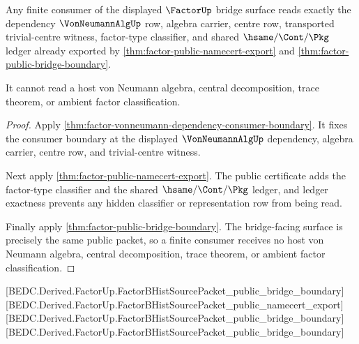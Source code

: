 \begin{theorem}
\label{thm:factor-bridge-consumer-completeness}
Any finite consumer of the displayed $\FactorUp$ bridge surface reads exactly
the dependency $\VonNeumannAlgUp$ row, algebra carrier, centre row, transported
trivial-centre witness, factor-type classifier, and shared $\hsame/\Cont/\Pkg$
ledger already exported by \autoref{thm:factor-public-namecert-export} and
\autoref{thm:factor-public-bridge-boundary}.

It cannot read a host von Neumann algebra, central decomposition, trace theorem,
or ambient factor classification.
\end{theorem}
\begin{proof}
Apply \autoref{thm:factor-vonneumann-dependency-consumer-boundary}. It fixes the
consumer boundary at the displayed $\VonNeumannAlgUp$ dependency, algebra
carrier, centre row, and trivial-centre witness.

Next apply \autoref{thm:factor-public-namecert-export}. The public certificate
adds the factor-type classifier and the shared $\hsame/\Cont/\Pkg$ ledger, and
ledger exactness prevents any hidden classifier or representation row from being
read.

Finally apply \autoref{thm:factor-public-bridge-boundary}. The bridge-facing
surface is precisely the same public packet, so a finite consumer receives no
host von Neumann algebra, central decomposition, trace theorem, or ambient
factor classification.
\end{proof}

[BEDC.Derived.FactorUp.FactorBHistSourcePacket\_public\_bridge\_boundary]
[BEDC.Derived.FactorUp.FactorBHistSourcePacket\_public\_namecert\_export]
[BEDC.Derived.FactorUp.FactorBHistSourcePacket\_public\_bridge\_boundary]
[BEDC.Derived.FactorUp.FactorBHistSourcePacket\_public\_bridge\_boundary]

